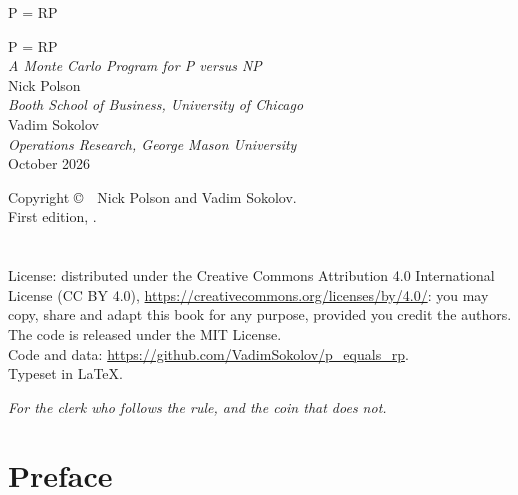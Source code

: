 \documentclass[11pt,twoside,openany]{book}
\theoremstyle{plain}
\theoremstyle{definition}
\theoremstyle{remark}
\begin{document}
\frontmatter
\thispagestyle{empty}
\begin{center}
\vspace*{3in}
{\Large\scshape P = RP}
\end{center}
\clearpage


\thispagestyle{empty}
\begin{center}
\vspace*{1.6in}
{\LARGE\scshape P = RP}\\[0.6em]
{\large\itshape A Monte Carlo Program for P versus NP}\\[2.2in]
{\large Nick Polson}\\
{\small\itshape Booth School of Business, University of Chicago}\\[1.0em]
{\large Vadim Sokolov}\\
{\small\itshape Operations Research, George Mason University}\\[1.6in]
{\small October 2026}
\end{center}
\clearpage

\thispagestyle{empty}
\vspace*{4.2in}
\begin{flushleft}
\small
Copyright \copyright\ \BookYear\ Nick Polson and Vadim Sokolov.\\
First edition, \BookYear.%
\ifx\BookISBNline\empty\else\\[0.6em]\BookISBNline\fi
\ifx\BookDOIline\empty\else\\[0.6em]\BookDOIline\fi
\\[0.6em]License: distributed under the Creative Commons Attribution 4.0 International License (CC BY 4.0), \url{https://creativecommons.org/licenses/by/4.0/}: you may copy, share and adapt this book for any purpose, provided you credit the authors. The code is released under the MIT License.\\[0.6em]
Code and data: \url{https://github.com/VadimSokolov/p_equals_rp}.\\[0.6em]
Typeset in \LaTeX.
\end{flushleft}
\clearpage

\thispagestyle{empty}
\vspace*{3in}
\begin{center}
\itshape For the clerk who follows the rule, and the coin that does not.
\end{center}
\clearpage

\tableofcontents

\chapter*{Preface}
\end{document}
